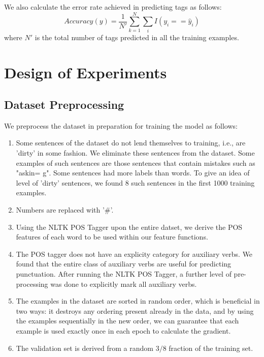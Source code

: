 \documentclass[11pt,a4paper,oneside]{article}
\begin{document}
We also calculate the error rate achieved in predicting tags as follows:
\begin{equation}
Accuracy(y) = \frac{1}{N'}\sum_{k = 1}^{N}\sum_{i}I(y_i == \hat{y}_i)
\end{equation}
where $N'$ is the total number of tags predicted in all the training examples.

\section{Design of Experiments}
\label{sec:Experiments}

\subsection{Dataset Preprocessing}

We preprocess the dataset in preparation for training the model as follows:

\begin{enumerate}
\item Some sentences of the dataset do not lend themselves to training, i.e., are 'dirty' in some fashion. We eliminate these sentences from the dataset. Some examples of such sentences are those sentences that contain mistakes such as "askin= g". Some sentences had more labels than words. To give an idea of level of 'dirty' sentences, we found 8 such sentences in the first 1000 training examples.
\item Numbers are replaced with '\#'.
\item Using the NLTK POS Tagger upon the entire datset, we derive the POS features of each word to be used within our feature functions.
\item The POS tagger does not have an explicity category for auxiliary verbs. We found that the entire class of auxiliary verbs are useful for predicting punctuation. After running the NLTK POS Tagger, a further level of pre-processing was done to explicitly mark all auxiliary verbs.
\item The examples in the dataset are sorted in random order, which is beneficial in two ways: it destroys any ordering present already in the data, and by using the examples sequentially in the new order, we can guarantee that each example is used exactly once in each epoch to calculate the gradient.
\item The validation set is derived from a random $3/8$ fraction of the training set.
\end{enumerate}
\end{document}
